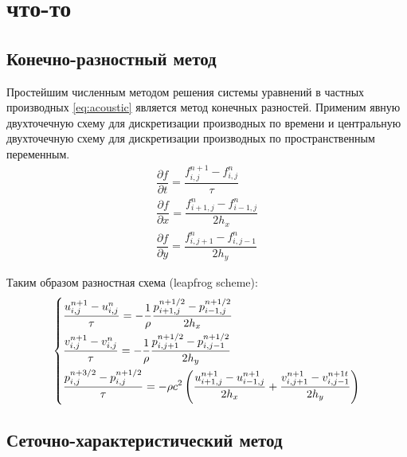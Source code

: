 \documentclass[12pt,a4paper]{article}
\begin{document}




\tableofcontents

\newpage





\section{что-то}

\subsection{Конечно-разностный метод}

Простейшим численным методом решения системы уравнений в частных производных \eqref{eq:acoustic} является метод конечных разностей. Применим явную двухточечную схему для дискретизации производных по времени и центральную двухточечную схему для дискретизации производных по пространственным переменным.
\begin{gather*}
    \dfrac{\partial f}{\partial t} = \dfrac{f^{n+1}_{i,j} - f^{n}_{i,j}}{\tau} \\
    \dfrac{\partial f}{\partial x} = \dfrac{f^{n}_{i+1,j} - f^{n}_{i-1,j}}{2 h_x} \\
    \dfrac{\partial f}{\partial y} = \dfrac{f^{n}_{i,j+1} - f^{n}_{i,j-1}}{2 h_y}
\end{gather*}

Таким образом разностная схема (leapfrog scheme):
\begin{equation}
	\begin{dcases}
		\frac{u^{n+1}_{i,j} - u^{n}_{i,j}}{\tau} = -\frac{1}{\rho}\frac{p^{n+1/2}_{i+1,j} - p^{n+1/2}_{i-1,j}}{2 h_x} \\
		\frac{v^{n+1}_{i,j} - v^{n}_{i,j}}{\tau} = -\frac{1}{\rho}\frac{p^{n+1/2}_{i,j+1} - p^{n+1/2}_{i,j-1}}{2 h_y} \\
	    \dfrac{p^{n+3/2}_{i,j} - p^{n+1/2}_{i,j}}{\tau}= -\rho c^2 \left(\frac{u^{n+1}_{i+1,j} - u^{n+1}_{i-1,j}}{2 h_x} + \dfrac{v^{n+1}_{i,j+1} - v^{n+1t}_{i,j-1}}{2 h_y}\right) \\
	\end{dcases}\label{eq:diff}
\end{equation}

\subsection{Сеточно-характеристический метод}
\end{document}

